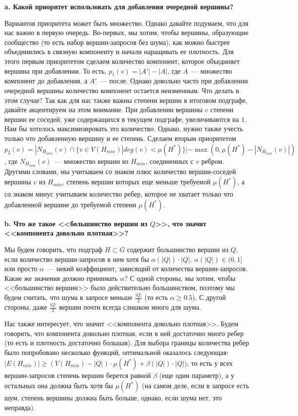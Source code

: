 \documentclass[11pt,a4paper,oneside]{article}
\begin{document}
\textbf{a. Какой приоритет использовать для добавления очередной вершины?}

Вариантов приоритета может быть множество. Однако давайте подумаем, что для нас важно в первую очередь. Во-первых, мы хотим, чтобы вершины, образующие сообщество (то есть набор вершин-запросов без шума), как можно быстрее объединились в связную компоненту и начали наращивать ее плотность. Для этого первым приоритетом сделаем количество компонент, которое объединяет вершина при добавлении. То есть, $p_1(v) = |A'| - |A|$, где $A$~--- множество компонент до добавления, а $A'$~--- после. Однако довольно часто при добавлении очередной вершины количество компонент остается неизменным. Что делать в этом случае? Так как для нас также важны степени вершин в итоговом подграфе, давайте акцентируем на этом внимание. При добавлении вершины $v$ степени вершин ее соседей, уже содержащихся в текущем подграфе, увеличиваются на $1$. Нам бы хотелось максимизировать это количество. Однако, нужно также учесть только что добавленную вершину и ее степень. Сделаем вторым приоритетом $p_2(v) = |N_{H_{min}}(v) \cap \{v \in V(H_{min}) | deg(v) < \mu(H^*)\}| - \max(0, \mu(H^*) - |N_{H_{min}}(v)|)$, где $N_{H_{min}}(v)$~--- множество вершин из $H_{min}$, соединенных с $v$ ребром. Другими словами, мы учитываем со знаком плюс количество вершин-соседей вершины $v$ из $H_{min}$, степень вершин которых еще меньше требуемой $\mu(H^*)$, а со знаком минус учитываем количество ребер, которое не хватает только что добавленной вершине до требуемой степени $\mu(H^*)$.

\textbf{b. Что же такое <<большинство вершин из $Q$>>, что значит <<компонента довольно плотная>>?}

Мы будем говорить, что подграф $H \subset G$ содержит большинство вершин из $Q$, если количество вершин-запросов в нем хотя бы $\alpha(|Q|) \cdot |Q|$. $\alpha(|Q|) \in (0, 1]$ или просто $\alpha$~--- некий коэффициент, зависящий от количества вершин-запросов. Какие же значения должно принимать $\alpha$? С одной стороны, мы хотим, чтобы <<большинство вершин>> было действительно большинством, поэтому мы будем считать, что шума в запросе меньше $\frac{|Q|}{2}$ (то есть $\alpha \ge 0.5$). С другой стороны, даже $\frac{|Q|}{2}$ вершин почти всегда слишком много для шума.  

Нас также интересует, что значит <<компонента довольно плотная>>. Будем говорить, что компонента довольно плотная, если в ней достаточно много ребер (то есть и плотность достаточно большая). Для выбора границы количества ребер было попробовано несколько функций, оптимальной оказалось следующая: $|E(H_{min})| \ge (V(H_{min}) - |Q|) \cdot \mu(H^*) + \beta(|Q|) \cdot |Q|)$, то есть у всех вершин-запросов степень вершин берется равной $\beta$ (еще один параметр), а у остальных она должна быть хотя бы $\mu(H^*)$ (на самом деле, если в запросе есть шум, степень вершины должна быть больше, однако, если шума нет, это неправда). 
\end{document}
